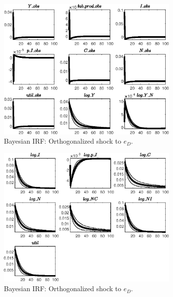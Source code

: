 \begin{figure}[H]
\centering 
\includegraphics[width=0.80\textwidth]{BRS_imp_mobility_alt/Output/BRS_imp_mobility_alt_Bayesian_IRF_e_D_1}
\caption{Bayesian IRF: Orthogonalized shock to ${e_D}$.}
\label{Fig:BayesianIRF:e_D:1}
\end{figure}
 
\begin{figure}[H]
\centering 
\includegraphics[width=0.80\textwidth]{BRS_imp_mobility_alt/Output/BRS_imp_mobility_alt_Bayesian_IRF_e_D_2}
\caption{Bayesian IRF: Orthogonalized shock to ${e_D}$.}
\label{Fig:BayesianIRF:e_D:2}
\end{figure}
 
